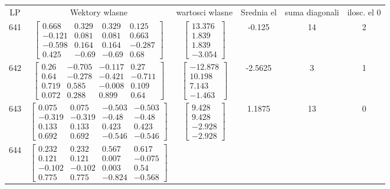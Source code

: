 \documentclass[a4paper,12pt]{article}
\begin{document}
\bgroup {} \vspace{0.2in} \begin{tabular}{c c c c c c}
LP &Wektory wlasne & wartosci wlasne & Srednia el & suma diagonali & ilosc. el 0\\
641
&
$\begin{bmatrix} 0.668 & 0.329 & 0.329 & 0.125 \\ -0.121 & 0.081 & 0.081 & 0.663 \\ -0.598 & 0.164 & 0.164 & -0.287 \\ 0.425 & -0.69 & -0.69 & 0.68 \end{bmatrix}$
&
$\begin{bmatrix} 13.376 \\ 1.839 \\ 1.839 \\ -3.054 \end{bmatrix}$
&
-0.125
&
14
&
2
\\
642
&
$\begin{bmatrix} 0.26 & -0.705 & -0.117 & 0.27 \\ 0.64 & -0.278 & -0.421 & -0.711 \\ 0.719 & 0.585 & -0.008 & 0.109 \\ 0.072 & 0.288 & 0.899 & 0.64 \end{bmatrix}$
&
$\begin{bmatrix} -12.878 \\ 10.198 \\ 7.143 \\ -1.463 \end{bmatrix}$
&
-2.5625
&
3
&
1
\\
643
&
$\begin{bmatrix} 0.075 & 0.075 & -0.503 & -0.503 \\ -0.319 & -0.319 & -0.48 & -0.48 \\ 0.133 & 0.133 & 0.423 & 0.423 \\ 0.692 & 0.692 & -0.546 & -0.546 \end{bmatrix}$
&
$\begin{bmatrix} 9.428 \\ 9.428 \\ -2.928 \\ -2.928 \end{bmatrix}$
&
1.1875
&
13
&
0
\\
644
&
$\begin{bmatrix} 0.232 & 0.232 & 0.567 & 0.617 \\ 0.121 & 0.121 & 0.007 & -0.075 \\ -0.102 & -0.102 & 0.003 & 0.54 \\ 0.775 & 0.775 & -0.824 & -0.568 \end{bmatrix}$

\end{tabular}
\end{document}
